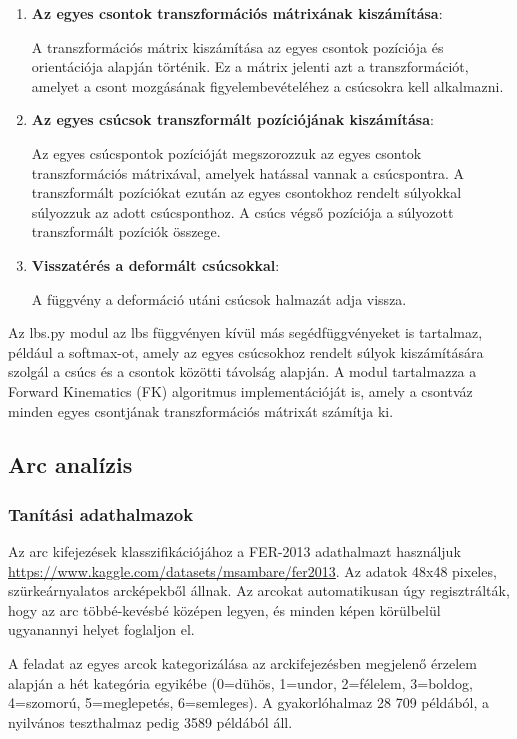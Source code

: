 \documentclass[12pt,a4]{article}
\begin{document}
\begin{enumerate}
    \item \textbf{Az egyes csontok transzformációs mátrixának kiszámítása}: 
    
    A transzformációs mátrix kiszámítása az egyes csontok pozíciója és orientációja alapján történik. 
	Ez a mátrix jelenti azt a transzformációt, amelyet a csont mozgásának figyelembevételéhez a csúcsokra kell alkalmazni.

     \item \textbf{Az egyes csúcsok transzformált pozíciójának kiszámítása}:
     
     Az egyes csúcspontok pozícióját megszorozzuk az egyes csontok transzformációs mátrixával, amelyek hatással vannak a csúcspontra.
	A transzformált pozíciókat ezután az egyes csontokhoz rendelt súlyokkal súlyozzuk az adott csúcsponthoz. A csúcs végső pozíciója a súlyozott transzformált pozíciók összege.
	
     \item \textbf{Visszatérés a deformált csúcsokkal}: 
     
     A függvény a deformáció utáni csúcsok halmazát adja vissza.
	
\end{enumerate}

    Az lbs.py modul az lbs függvényen kívül más segédfüggvényeket is tartalmaz, például a softmax-ot, amely az egyes csúcsokhoz rendelt súlyok kiszámítására szolgál a csúcs és a csontok közötti távolság alapján. 
A modul tartalmazza a Forward Kinematics (FK) algoritmus implementációját is, amely a csontváz minden egyes csontjának transzformációs mátrixát számítja ki.


    \newpage
	\subsection{Arc analízis}

    \subsubsection{Tanítási adathalmazok}
    Az arc kifejezések klasszifikációjához a FER-2013 adathalmazt használjuk \url{https://www.kaggle.com/datasets/msambare/fer2013}. Az adatok 48x48 pixeles, szürkeárnyalatos arcképekből állnak. Az arcokat automatikusan úgy regisztrálták, hogy az arc többé-kevésbé középen legyen, és minden képen körülbelül ugyanannyi helyet foglaljon el.

    A feladat az egyes arcok kategorizálása az arckifejezésben megjelenő érzelem alapján a hét kategória egyikébe (0=dühös, 1=undor, 2=félelem, 3=boldog, 4=szomorú, 5=meglepetés, 6=semleges). A gyakorlóhalmaz 28 709 példából, a nyilvános teszthalmaz pedig 3589 példából áll.
\end{document}
